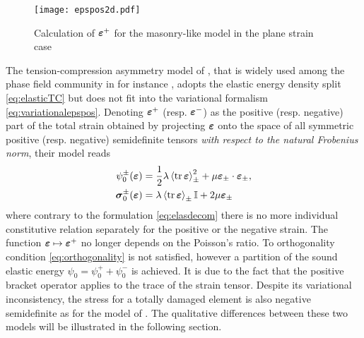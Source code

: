 \begin{figure}[htbp]
\texttt{[image: epspos2d.pdf]}
\caption{Calculation of $\eps^+$ for the masonry-like model \cite{FreddiRoyer-Carfagni:2010} in the plane strain case} \label{fig:epspos2dill}
\end{figure}

The tension-compression asymmetry model of \cite{MieheHofackerWelschinger:2010}, that is widely used among the phase field community in for instance \cite{HofackerMiehe:2012,BordenVerhooselScottHughesLandis:2012,KlinsmannRosatoKamlahMcMeeking:2015,MayVignolletBorst:2015}, adopts the elastic energy density split \eqref{eq:elasticTC} but does not fit into the variational formalism \eqref{eq:variationalepspos}. Denoting $\eps^+$ (resp. $\eps^-$) as the positive (resp. negative) part of the total strain obtained by projecting $\eps$ onto the space of all symmetric positive (resp. negative) semidefinite tensors \emph{with respect to the natural Frobenius norm}, their model reads
\begin{equation} \label{eq:miehe}
\begin{aligned}
\psi_0^\pm(\eps) &= \frac{1}{2}\lambda\inp{\tr\eps}_\pm^2+\mu\eps_\pm\cdot\eps_\pm, \\
\sig_0^\pm(\eps) &= \lambda\inp{\tr\eps}_\pm\mathbb{I}+2\mu\eps_\pm
\end{aligned}
\end{equation}
where contrary to the formulation \eqref{eq:elasdecom} there is no more individual constitutive relation separately for the positive or the negative strain. The function $\eps\mapsto\eps^+$ no longer depends on the Poisson's ratio. To orthogonality condition \eqref{eq:orthogonality} is not satisfied, however a partition of the sound elastic energy $\psi_0=\psi_0^++\psi_0^-$ is achieved. It is due to the fact that the positive bracket operator applies to the trace of the strain tensor. Despite its variational inconsistency, the stress for a totally damaged element is also negative semidefinite as for the model of \cite{FreddiRoyer-Carfagni:2010}. The qualitative differences between these two models will be illustrated in the following section.

